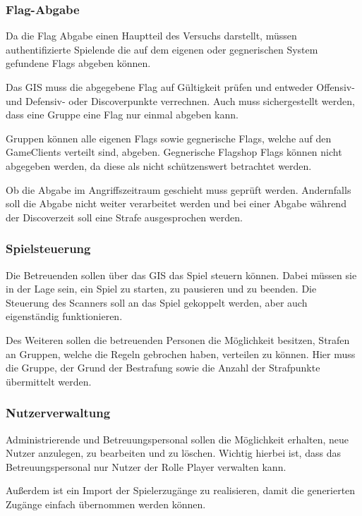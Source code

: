 \subsubsection{Flag-Abgabe}

Da die Flag Abgabe einen Hauptteil des Versuchs darstellt, müssen authentifizierte Spielende die auf dem eigenen oder gegnerischen System gefundene Flags abgeben können.

Das GIS muss die abgegebene Flag auf Gültigkeit prüfen und entweder Offensiv- und Defensiv- oder Discoverpunkte verrechnen. Auch muss sichergestellt werden, dass eine Gruppe eine Flag nur einmal abgeben kann.

Gruppen können alle eigenen Flags sowie gegnerische Flags, welche auf den GameClients verteilt sind, abgeben. Gegnerische Flagshop Flags können nicht abgegeben werden, da diese als nicht schützenswert betrachtet werden.

Ob die Abgabe im Angriffszeitraum geschieht muss geprüft werden. Andernfalls soll die Abgabe nicht weiter verarbeitet werden und bei einer Abgabe während der Discoverzeit soll eine Strafe ausgesprochen werden.


\subsubsection{Spielsteuerung}

Die Betreuenden sollen über das GIS das Spiel steuern können. Dabei müssen sie in der Lage sein, ein Spiel zu starten, zu pausieren und zu beenden. Die Steuerung des Scanners soll an das Spiel gekoppelt werden, aber auch eigenständig funktionieren.

Des Weiteren sollen die betreuenden Personen die Möglichkeit besitzen, Strafen an Gruppen, welche die Regeln gebrochen haben, verteilen zu können. Hier muss die Gruppe, der Grund der Bestrafung sowie die Anzahl der Strafpunkte übermittelt werden.

\subsubsection{Nutzerverwaltung}

Administrierende und Betreuungspersonal sollen die Möglichkeit erhalten, neue Nutzer anzulegen, zu bearbeiten und zu löschen. Wichtig hierbei ist, dass das Betreuungspersonal nur Nutzer der Rolle Player verwalten kann.

Außerdem ist ein Import der Spielerzugänge zu realisieren, damit die generierten Zugänge einfach übernommen werden können.

